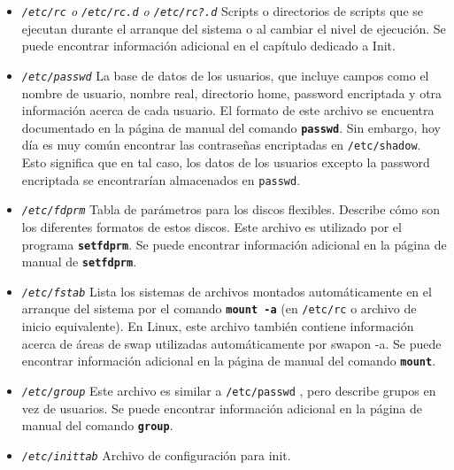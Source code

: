 \begin{itemize} 

\item \textit{\texttt{/etc/rc} o
\texttt{/etc/rc.d} o \texttt{/etc/rc?.d}}
 Scripts o directorios de scripts que se ejecutan durante el
arranque del sistema o  al cambiar el nivel de ejecución. Se puede
encontrar información adicional en el capítulo dedicado a Init.


\item \textit{\texttt{/etc/passwd}}
 La base de datos de los usuarios, que incluye campos como el
nombre de usuario, nombre real, directorio home, password encriptada y otra
información acerca de cada usuario.  El formato de este archivo se encuentra
documentado en la página de manual del comando \texttt{\textbf{passwd}}. 
	 Sin embargo, hoy día es muy común encontrar las contraseñas encriptadas
	 en \texttt{/etc/shadow}. Esto significa que en tal caso,
	 los 	 	 datos de los usuarios excepto la password encriptada se
	 encontrarían 	 		 almacenados en
	 \texttt{passwd}.  

	\item \textit{\texttt{/etc/fdprm}}
	 Tabla de parámetros para los discos flexibles.  Describe
	cómo son los diferentes formatos de estos discos.  Este archivo es
	utilizado por el programa \texttt{\textbf{setfdprm}}.  Se puede
	encontrar información adicional en la página de manual de
	\texttt{\textbf{setfdprm}}.  

	\item \textit{\texttt{/etc/fstab}}
	 Lista los sistemas de archivos montados automáticamente
	en 		el arranque del sistema por el comando \texttt{\textbf{mount
	-a}} (en \texttt{/etc/rc} o archivo de inicio
	equivalente). En 			Linux, este archivo también
	contiene información acerca de áreas de swap 		utilizadas
	automáticamente por swapon -a. Se puede encontrar información
	adicional en 
la página de manual del
	comando \texttt{\textbf{mount}}.  

	
	\item \textit{\texttt{/etc/group}}
	 Este archivo es similar a
	\texttt{/etc/passwd} , pero describe grupos en vez de
	usuarios. Se puede encontrar información 		adicional en la
	página de manual del comando \texttt{\textbf{group}}.
	


	\item \textit{\texttt{/etc/inittab}}
	 Archivo de configuración para init.
	



\end{itemize}
